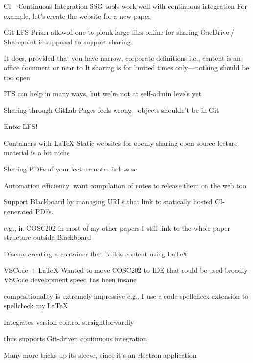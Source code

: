 \documentclass[aspectratio=169,t]{beamer}
\begin{document}
\begin{dframe}{CI---Continuous Integration}
  \1 SSG tools work well with continuous integration
  \1 For example, let's create the website for a new paper
\end{dframe}

\begin{dframe}{Git LFS}
  \1 Prism allowed one to plonk large files online for sharing
  \1 OneDrive / Sharepoint is supposed to support sharing

  \2 It does, provided that you have narrow, corporate definitions
  \2 i.e., content is an office document or near to It
  \2 sharing is for limited times only---nothing should be too open

  \1 ITS can help in many ways, but we're not at self-admin levels yet

  \1 Sharing through GitLab Pages feels wrong---objects shouldn't be in Git
  
  \1 Enter LFS!

\end{dframe}

\begin{dframe}{Containers with \LaTeX}
  \1 Static websites for openly sharing open source lecture material is a bit niche

  \1 Sharing PDFs of your lecture notes is less so
  
  \2 Automation efficiency: want compilation of notes to release them on the web too

  \1 Support Blackboard by managing URLs that link to statically hosted CI-generated PDFs.

  \2 e.g., in COSC202
  \2 in most of my other papers I still link to the whole paper structure outside Blackboard

  \1 Discuss creating a container that builds content using \LaTeX{}
\end{dframe}


\begin{dframe}{VSCode + \LaTeX}
  \1 Wanted to move COSC202 to IDE that could be used broadly
  \1 VSCode development speed has been insane
  
  \2 compositionality is extremely impressive
  \2 e.g., I use a code spellcheck extension to spellcheck my \LaTeX{}

  \1 Integrates version control straightforwardly
  
  \2 thus supports Git-driven continuous integration
  
  \1 Many more tricks up its sleeve, since it's an electron application
\end{dframe}
\end{document}
